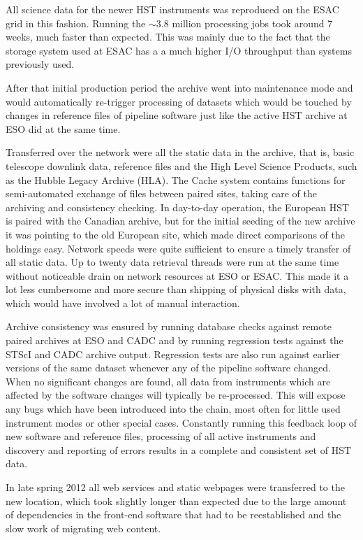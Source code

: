 All science data for the newer HST instruments was reproduced on the ESAC grid in this fashion. 
Running the $\sim$3.8 million processing jobs took around 7 weeks, much faster than expected. This was mainly due to the fact that the storage system used at ESAC has a a much higher I/O throughput than systems previously used.

After that initial production period the archive went into maintenance mode and would automatically re-trigger processing of datasets which would be touched by changes in reference files of pipeline software just like the active HST archive at ESO did at the same time.

Transferred over the network were all the static data in the archive, that
is, basic telescope downlink data, reference
files and the High Level Science Products, such as the Hubble Legacy
Archive (HLA).
The  Cache system contains functions for semi-automated exchange of files between paired sites, taking care of the archiving and consistency checking. In day-to-day operation, the European HST is paired with the Canadian archive, but for the initial seeding of the new archive  it was pointing to the old European site, which made direct comparisons of the holdings easy. 
Network speeds were quite sufficient to ensure a timely transfer of all static data. Up to twenty data retrieval threads were run at the same time without noticeable drain on network resources at ESO or ESAC. This made it a lot less cumbersome and more secure than shipping of physical disks with data, which would have involved a lot of manual interaction.

Archive consistency was  ensured by running 
database checks against remote paired archives at ESO and CADC 
and by running regression tests against the STScI and CADC archive output.
Regression tests are also run against earlier versions of the same dataset whenever any of the pipeline software changed. When no significant changes are found, all data from instruments which are affected by the software changes will typically be re-processed. This will expose any bugs which have been introduced into the chain, most often for little used instrument modes or other special cases.
Constantly  running this feedback loop of new software and reference files, processing of all active instruments and discovery and reporting of errors 
results in a complete and consistent set of HST data. 

In late spring 2012 all web services and static webpages were transferred to the new location, which took slightly longer than expected due to the large amount of dependencies in the front-end software that had to be reestablished and the slow work of migrating web content.

